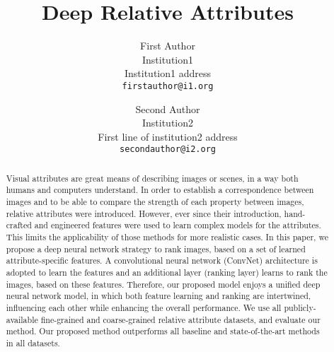 \documentclass[10pt,twocolumn,letterpaper]{article}
\begin{document}
\title{Deep Relative Attributes}

\author{First Author\\
Institution1\\
Institution1 address\\
{\tt\small firstauthor@i1.org}
\and
Second Author\\
Institution2\\
First line of institution2 address\\
{\tt\small secondauthor@i2.org}
}

\maketitle

\begin{abstract}
Visual attributes are great means of describing images or scenes, in a way both humans and computers understand. In order to establish a correspondence between images and to be able to compare the strength of each property between images, relative attributes were introduced. However, ever since their introduction, hand-crafted and engineered features were used to learn complex models for the attributes. This limits the applicability of those methods for more realistic cases. In this paper, we propose a deep neural network strategy to rank images, based on a set of learned attribute-specific features. A convolutional neural network (ConvNet) architecture is adopted to learn the features and an additional layer (ranking layer) learns to rank the images, based on these features. Therefore, our proposed model enjoys a unified deep neural network model, in which both feature learning and ranking are intertwined, influencing each other while enhancing the overall performance. We use all publicly-available fine-grained and coarse-grained relative attribute datasets, and evaluate our method. Our proposed method outperforms all baseline and state-of-the-art methods in all datasets. 
\end{abstract}








{\small


}
\end{document}
